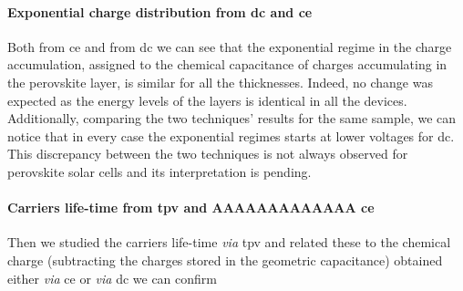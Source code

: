 \begin{figure}
\end{figure}

\paragraph{Exponential charge distribution from \gls{dc} and \gls{ce}}
Both from \gls{ce} and from \gls{dc} we can see that the exponential regime in the charge accumulation, assigned to the chemical capacitance of charges accumulating in the perovskite layer, is similar for all the thicknesses.
Indeed, no change was expected as the energy levels of the layers is identical in all the devices.
Additionally, comparing the two techniques' results for the same sample, we can notice that in every case the exponential regimes starts at lower voltages for \gls{dc}.
This discrepancy between the two techniques is not always observed for perovskite solar cells and its interpretation is pending.





\paragraph{Carriers life-time from \gls{tpv} and AAAAAAAAAAAAA \gls{ce}}
Then we studied the carriers life-time \textsl{via} \gls{tpv} and related these to the chemical charge (subtracting the charges stored in the geometric capacitance) obtained either \textsl{via} \gls{ce} or \textsl{via} \gls{dc} we can confirm 

